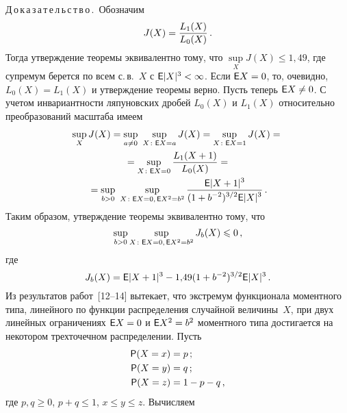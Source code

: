 \begin{multicols}{2}
\noindent
Д\,о\,к\,а\,з\,а\,т\,е\,л\,ь\,с\,т\,в\,о\,.\ 
Обозначим
\begin{equation*}
J(X)=\displaystyle\frac{\displaystyle L_1(X)\mathstrut}{\displaystyle L_0(X)\mathstrut}\,.
\end{equation*}
Тогда утверждение теоремы эквивалентно тому, что $\sup\limits_X
J(X)\leqslant1{,}49$, где супремум берется по всем с.\,в.~$X$ с
${\sf E}|X|^3<\infty$. Если ${\sf E} X=0$, то, очевидно, $L_0(X)=L_1(X)$ и 
утверждение теоремы верно. Пусть теперь ${\sf E}
X\neq0$. С учетом инвариантности ляпуновских дробей $L_0(X)$ и
$L_1(X)$ относительно преобразований масштаба имеем
\begin{multline*}
\sup\limits_{X}J(X) = \sup\limits_{a\neq0}\ \sup\limits_{X\colon{\sf E} X=a}J(X) =
\sup\limits_{X\colon {\sf E} X=1}J(X)={}\\
{}=\sup\limits_{X\colon {\sf E} X=0}\displaystyle\frac{\displaystyle L_1(X+1)\mathstrut}{\displaystyle L_0(X)\mathstrut}={}\\
{}=\sup\limits_{b>0}\
\sup\limits_{X\colon {\sf E} X=0,\,{\sf E} X^2=b^2} \displaystyle\frac{\displaystyle {\sf E}|X+1|^3\mathstrut}{\displaystyle (1+b^{-2})^{3/2}{\sf E}|X|^3\mathstrut}\,.
\end{multline*}
Таким образом, утверждение теоремы эквивалентно тому, что
\begin{equation*}
\sup\limits_{b>0}\sup\limits_{X\colon {\sf E} X=0,\,{\sf E} X^2=b^2}J_b(X)\leqslant0\,,
\end{equation*}
где
\begin{equation*}
J_b(X)={{\sf E}|X+1|^3} -1{,}49(1+b^{-2})^{3/2}{\sf E}|X|^3\,.
\end{equation*}
Из результатов работ~[12--14]
вытекает, что экстремум функционала моментного типа, линейного по
функции распределения случайной величины~$X$, при двух линейных
ограничениях ${\sf E} X=0$ и ${\sf E} X^2=b^2$ моментного типа достигается на
некотором трехточечном распределении. Пусть
\begin{align*}
{\sf P}(X=x)&=p\,;\\
{\sf P}(X=y)&=q\,;\\
{\sf P}(X=z)&=1-p-q\,,
\end{align*}
где $p,q\geqslant0$, $p+q\leqslant1$, $x\leqslant y\leqslant z$. Вычисляем

\pagebreak


\end{multicols}
